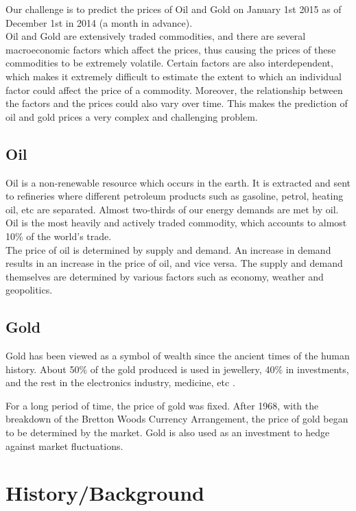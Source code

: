 \documentclass[runningheads]{llncs}
\begin{document}
Our challenge is to predict the prices of Oil and Gold on January 1st 2015 as of December 1st in 2014 (a month in advance). \\

\noindent Oil and Gold are extensively traded commodities, and there are several macroeconomic factors which affect the prices, thus causing the prices of these commodities to be extremely volatile. Certain factors are also interdependent, which makes it extremely difficult to estimate the extent to which an individual factor could affect the price of a commodity. Moreover, the relationship between the factors and the prices could also vary over time. This makes the prediction of oil and gold prices a very complex and challenging problem.


\subsection{Oil}

Oil is a non-renewable resource which occurs in the earth. It is extracted and sent to refineries where different petroleum products such as gasoline, petrol, heating oil, etc are separated. Almost two-thirds of our energy demands are met by oil. Oil is the most heavily and actively traded commodity, which accounts to almost 10\% of the world's trade.\\

\noindent The price of oil is determined by supply and demand. An increase in demand results in an increase in the price of oil, and vice versa. The supply and demand themselves are determined by various factors such as economy, weather and geopolitics. \\

\noindent 
\subsection{Gold}
Gold has been viewed as a symbol of wealth since the ancient times of the human history. About 50\% of the gold produced is used in jewellery, 40\% in investments, and the rest in the electronics industry, medicine, etc \cite{goldusage}.

\noindent For a long period of time, the price of gold was fixed. After 1968, with the breakdown of the Bretton Woods Currency Arrangement, the price of gold began to be determined by the market. Gold is also used as an investment to hedge against market fluctuations. 


\section{History/Background}
\end{document}

